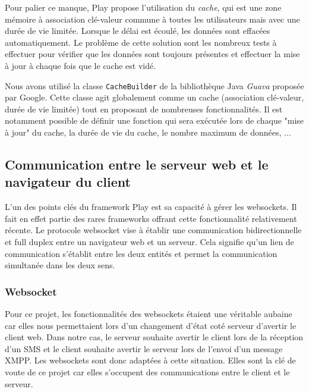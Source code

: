 Pour palier ce manque, Play propose l'utilisation du \textit{cache}, qui est une zone mémoire à association clé-valeur commune à toutes les utilisateurs mais avec une durée de vie limitée.
Lorsque le délai est écoulé, les données sont effacées automatiquement.
Le problème de cette solution sont les nombreux tests à effectuer pour vérifier que les données sont toujours présentes et effectuer la mise à jour à chaque fois que le cache est vidé.

Nous avons utilisé la classe \lstinline{CacheBuilder} de la bibliothèque Java \textit{Guava} proposée par Google.
Cette classe agit globalement comme un cache (association clé-valeur, durée de vie limitée) tout en proposant de nombreuses fonctionnalités.
Il est notamment possible de définir une fonction qui sera exécutée lors de chaque "mise à jour" du cache, la durée de vie du cache, le nombre maximum de données, ...




\subsection{Communication entre le serveur web et le navigateur du client}

L'un des points clés du framework Play est sa capacité à gérer les websockets.
Il fait en effet partie des rares frameworks offrant cette fonctionnalité relativement récente.
Le protocole websocket vise à établir une communication bidirectionnelle et full duplex entre un navigateur web et un serveur.
Cela signifie qu'un lien de communication s'établit entre les deux entités et permet la communication simultanée dans les deux sens. 


\subsubsection{Websocket}

Pour ce projet, les fonctionnalités des websockets étaient une véritable aubaine car elles nous permettaient lors d'un changement d'état coté serveur d'avertir le client web.
Dans notre cas, le serveur souhaite avertir le client lors de la réception d'un SMS et le client souhaite avertir le serveur lors de l'envoi d'un message XMPP.
Les websockets sont donc adaptées à cette situation.
Elles sont la clé de voute de ce projet car elles  s'occupent des communications entre le client et le serveur.

